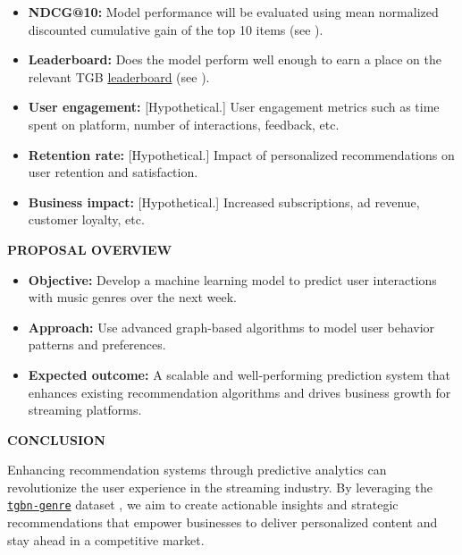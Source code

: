\documentclass[10pt, letterpaper]{article}
\renewcommand{\section}[1]{%
	    \vspace{\parskip}
		{\large \bfseries\uppercase{#1}}
}
\newcommand{\itemTitle}[1]{%
	{\bfseries{#1}}
}
\begin{document}
\begin{itemize}
\item \itemTitle{NDCG@10:} Model performance will be evaluated using mean normalized  discounted cumulative gain of the top 10 items (see \cite{H:2023}).
\item \itemTitle{Leaderboard:} Does the model perform well enough to earn a place on the relevant TGB {\href{https://tgb.complexdatalab.com/docs/leader_nodeprop/\#tgbn-genre}{leaderboard}} (see \cite{H_web:2023}).
\item \itemTitle{User engagement:} [Hypothetical.] User engagement metrics such as time spent on platform, number of interactions, feedback, etc.
\item \itemTitle{Retention rate:} [Hypothetical.] Impact of personalized recommendations on user retention and satisfaction.
\item \itemTitle{Business impact:} [Hypothetical.] Increased subscriptions, ad revenue, customer loyalty, etc.
\end{itemize}
	
\section{Proposal Overview}

\begin{itemize}
\item \itemTitle{Objective:} Develop a machine learning model to 
predict user interactions with music genres over the next week.
\item \itemTitle{Approach:} Use advanced graph-based algorithms 
to model user behavior patterns and preferences.
\item \itemTitle{Expected outcome:} A scalable and well-performing prediction system that enhances existing recommendation algorithms and drives business growth for streaming platforms.
\end{itemize}
	
\section{Conclusion}

Enhancing recommendation systems through predictive analytics can  revolutionize the user experience in the streaming industry. By leveraging the \href{https://tgb.complexdatalab.com/docs/nodeprop/}{\tt{tgbn-genre}} dataset \cite{tgbn-genre}, we aim to create actionable insights and strategic recommendations that empower businesses to deliver personalized content and stay ahead in a competitive market.
\end{document}
